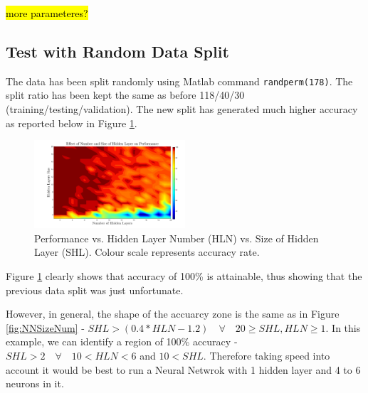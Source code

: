 \documentclass[10pt,twocolumn,letterpaper]{article}
\begin{document}
\hl{more parameteres?}

\subsection{Test with Random Data Split}

The data has been split randomly using Matlab command {\tt\small randperm(178)}. The split ratio has been kept the same as before 118/40/30 (training/testing/validation). The new split has generated much higher accuracy as reported below in Figure \ref{fig:NewSplit}.

\begin{figure}[H]
\centering
\includegraphics[width=0.5\textwidth]{../results/NN2_2}
\caption{Performance vs. Hidden Layer Number (HLN) vs. Size of Hidden Layer (SHL). Colour scale represents accuracy rate.
\label{fig:NewSplit}}
\end{figure}

Figure \ref{fig:NewSplit} clearly shows that accuracy of 100\% is attainable, thus showing that the previous data split was just unfortunate.

However, in general, the shape of the accuarcy zone is the same as in Figure \ref{fig:NNSizeNum} - $SHL > (0.4*HLN-1.2) \quad \forall \quad 20 \geq SHL, HLN \geq 1$. In this example, we can identify a region of 100\% accuracy - $SHL > 2 \quad \forall \quad  10 < HLN < 6$ and $10 < SHL$. Therefore taking speed into account it would be best to run a Neural Netwrok with 1 hidden layer and 4 to 6 neurons in it.
\end{document}
